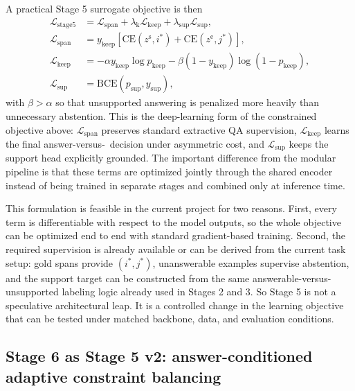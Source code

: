 A practical Stage 5 surrogate objective is then
\begin{align}
  \mathcal{L}_{\mathrm{stage5}}
  &=
  \mathcal{L}_{\mathrm{span}}
  +
  \lambda_{\mathrm{k}} \mathcal{L}_{\mathrm{keep}}
  +
  \lambda_{\mathrm{sup}} \mathcal{L}_{\mathrm{sup}}, \\
  \mathcal{L}_{\mathrm{span}}
  &=
  y_{\mathrm{keep}}
  \left[
    \mathrm{CE}(z^{\mathrm{s}}, i^{*})
    +
    \mathrm{CE}(z^{\mathrm{e}}, j^{*})
  \right], \\
  \mathcal{L}_{\mathrm{keep}}
  &=
  - \alpha y_{\mathrm{keep}} \log p_{\mathrm{keep}}
  - \beta \left(1-y_{\mathrm{keep}}\right)\log\!\left(1-p_{\mathrm{keep}}\right), \\
  \mathcal{L}_{\mathrm{sup}}
  &=
  \mathrm{BCE}\!\left(p_{\mathrm{sup}}, y_{\mathrm{sup}}\right),
\end{align}
with \(\beta > \alpha\) so that unsupported answering is penalized more
heavily than unnecessary abstention.
This is the deep-learning form of the constrained objective above:
\(\mathcal{L}_{\mathrm{span}}\) preserves standard extractive QA supervision,
\(\mathcal{L}_{\mathrm{keep}}\) learns the final answer-versus-\abstain\
decision under asymmetric cost, and
\(\mathcal{L}_{\mathrm{sup}}\) keeps the support head explicitly grounded.
The important difference from the modular pipeline is that these terms are
optimized jointly through the shared encoder instead of being trained in
separate stages and combined only at inference time.

This formulation is feasible in the current project for two reasons.
First, every term is differentiable with respect to the model outputs, so the
whole objective can be optimized end to end with standard gradient-based
training.
Second, the required supervision is already available or can be derived from
the current task setup:
gold spans provide \((i^{*}, j^{*})\), unanswerable examples supervise
abstention, and the support target can be constructed from the same
answerable-versus-unsupported labeling logic already used in Stages 2 and 3.
So Stage 5 is not a speculative architectural leap.
It is a controlled change in the learning objective that can be tested under
matched backbone, data, and evaluation conditions.

\subsection{Stage 6 as Stage 5 v2: answer-conditioned adaptive constraint balancing}

